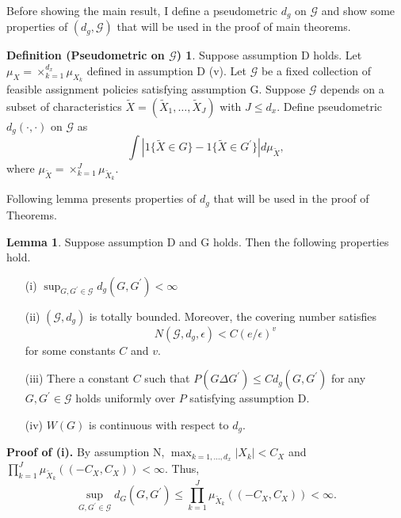 \documentclass[12pt,oneside,reqno,english]{amsart}
\theoremstyle{definition}
\newtheorem{lemma}{Lemma}
\newtheorem*{defP}{Definition (Pseudometric on $\mathcal{G}$)}
\begin{document}
Before showing the main result, I define a pseudometric $d_{g}$ on $\mathcal{G}$ and show some properties of $(d_{g},\mathcal{G})$ that will be used in the proof of main theorems. 
\begin{defP}
Suppose assumption D holds. Let $\mu_{X}=\times_{k=1}^{d_{x}}\mu_{X_{k}}$ defined in assumption D (v).  
Let $\mathcal{G}$ be a fixed collection of feasible assignment policies satisfying assumption G. 
Suppose $\mathcal{G}$ depends on a subset of characteristics $\tilde{X}=(\tilde{X}_{1},\ldots,\tilde{X}_{J})$ with $J\leq d_{x}$. 
Define pseudometric $d_{g}(\cdot,\cdot)$ on $\mathcal{G}$ as 
\[\int |1\{\tilde{X}\in G\}-1\{\tilde{X}\in G^{\prime}\}| d\mu_{\tilde{X}},\]
where $\mu_{\tilde{X}}=\times_{k=1}^{J}\mu_{\tilde{X}_{k}}$. 
\end{defP} 
Following lemma presents properties of $d_{g}$ that will be used in the proof of Theorems. 
\begin{lemma}\label{l:metric}
Suppose assumption D and G holds. Then the following properties hold. 
\begin{itemize}
\item[{(i)}] $\sup_{G,G^{\prime}\in \mathcal{G}}d_{g}(G,G^{\prime})<\infty$

\item[{(ii)}] $(\mathcal{G},d_{g})$ is totally bounded. Moreover, the covering number satisfies 
\[N(\mathcal{G},d_{g},\epsilon)<C(e/\epsilon)^{v}\]
for some constants $C$ and $v$.

\item[{(iii)}] There a constant $C$ such that $P(G\Delta G^{\prime}) \leq Cd_{g}(G, G^{\prime})$ for any $G,G^{\prime}\in \mathcal{G}$ 
holds uniformly over $P$ satisfying assumption D.

\item[{(iv)}] $W(G)$ is continuous with respect to $d_{g}$.

\end{itemize}
\end{lemma}
\textbf{Proof of (i).}
By assumption N, $\max_{k=1,\ldots,d_{x}}|X_{k}|<C_{X}$ and $\prod_{k=1}^{J}\mu_{\tilde{X}_{k}}((-C_{X},C_{X}))<\infty$.
 Thus,   
\[\sup_{G,G^{\prime}\in \mathcal{G}}d_{G}(G,G^{\prime})\leq \prod_{k=1}^{J}\mu_{\tilde{X}_{k}}((-C_{X},C_{X}))<\infty.\]
\end{document}
